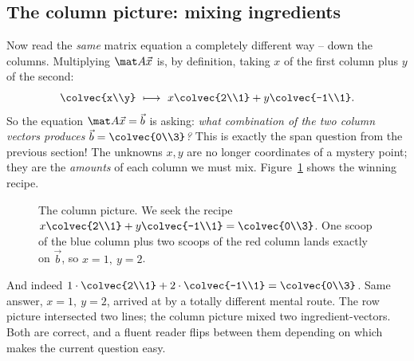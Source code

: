 \subsection{The column picture: mixing ingredients}

Now read the \emph{same} matrix equation a completely different way -- down the columns. Multiplying
$\mat A \vec x$ is, by definition, taking $x$ of the first column plus $y$ of the second:
\[
\colvec{x\\y}\ \longmapsto\
x\colvec{2\\1} + y\colvec{-1\\1}.
\]
So the equation $\mat A\vec x = \vec b$ is asking: \emph{what combination of the two column vectors
produces $\vec b = \colvec{0\\3}$?} This is exactly the span question from the previous section! The
unknowns $x,y$ are no longer coordinates of a mystery point; they are the \emph{amounts} of each
column we must mix. Figure~\ref{ch01:colpic} shows the winning recipe.

\begin{figure}[H]
\centering
{}
\caption{The column picture. We seek the recipe $x\colvec{2\\1}+y\colvec{-1\\1}=\colvec{0\\3}$. One
scoop of the blue column plus two scoops of the red column lands exactly on $\vec b$, so $x=1,\ y=2$.}
\label{ch01:colpic}
\end{figure}

And indeed $1\cdot\colvec{2\\1} + 2\cdot\colvec{-1\\1} = \colvec{0\\3}$. Same answer, $x=1,\ y=2$,
arrived at by a totally different mental route. The row picture intersected two lines; the column
picture mixed two ingredient-vectors. Both are correct, and a fluent reader flips between them
depending on which makes the current question easy.


